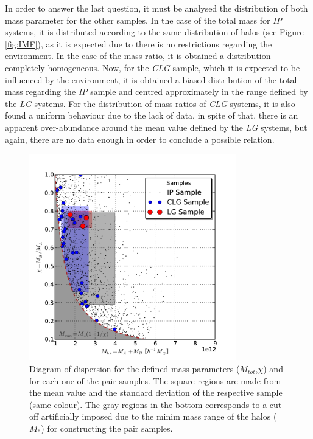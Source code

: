 In order to answer the last question, it must be analysed the distribution
of both mass parameter for the other samples. In the case of the total 
mass for \textit{IP} systems, it is distributed according to the same 
distribution of halos (see Figure \ref{fig:IMF}), as it is expected due
to there is no restrictions regarding the environment. In the case of
the mass ratio, it is obtained a distribution completely homogeneous. Now,
for the \textit{CLG} sample, which it is expected to be influenced by the 
environment, it is obtained a biased distribution of the total mass 
regarding the \textit{IP} sample and centred approximately in the range
defined by the \textit{LG} systems. For the distribution of mass ratios
of \textit{CLG} systems, it is also found a uniform behaviour due to the
lack of data, in spite of that, there is an apparent over-abundance around
the mean value defined by the \textit{LG} systems, but again, there are 
no data enough in order to conclude a possible relation.


\newpage
\begin{figure}[htbp]
	\centering
	\includegraphics[trim = 0mm 0mm 0mm 10mm, clip, width=0.8\textwidth]
	{./figures/4_results/IP_Mass_vs_Ratio.pdf}
	
	\caption{\small{Diagram of dispersion for the defined mass parameters
	($M_{tot}$,$\chi$) and for each one of the pair samples. The 
	square regions are made from the mean value and the standard deviation
	of the respective sample (same colour). The gray regions in the bottom
	corresponds to a cut off artificially imposed due to the minim mass 
	range of the halos ($M_*$) for constructing the pair samples.}}
	\label{fig:Dispersion_Mass_CLG}
\end{figure}



